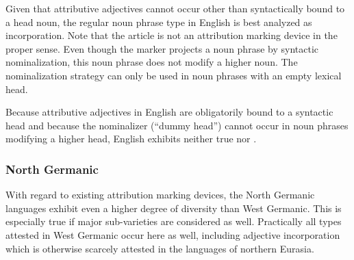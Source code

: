 Given that attributive adjectives cannot occur other than syntactically bound to a head noun, the regular noun phrase type in English is best analyzed as incorporation. Note that the article is not an attribution marking device in the proper sense. Even though the marker projects a noun phrase by syntactic nominalization, this noun phrase does not modify a higher noun. The nominalization strategy can only be used in noun phrases with an empty lexical head.
\begin{exe}
\begin{xlist}
\ex[*]{
\gll 	{} a smart \textbf{one} {} girl\\
	{{\upshape [}\textsubscript{NP} {\upshape [}\textsubscript{NP}} \textsc{indef} {\textsubscript{A}smart} \textsubscript{HEAD} {\upshape ]} \textsubscript{N}girl {\upshape ]]}\\
	}
\end{xlist}
\end{exe}
Because attributive adjectives in English are obligatorily bound to a syntactic head and because the nominalizer (“dummy head”) cannot occur in noun phrases modifying a higher head, English exhibits neither true  nor .

\subsubsection{North Germanic}
\label{n-germanic synchr}
With regard to existing attribution marking devices, the North Germanic languages exhibit even a higher degree of diversity than West Germanic. This is especially true if major sub-varieties are considered as well. Practically all types attested in West Germanic occur here as well, including adjective incorporation which is otherwise scarcely attested in the languages of northern Eurasia.

